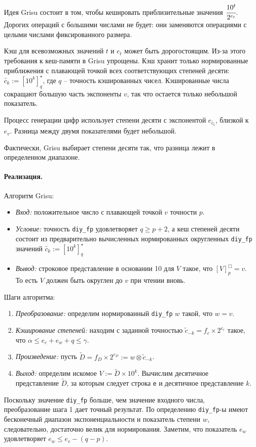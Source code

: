 \documentclass[a4paper, 12pt, twoside]{article}
\begin{document}
Идея \textsf{Grisu} состоит в том, чтобы кешировать приблизительные значения $\cfrac{10^t}{2^{e_t}}$.
Дорогих операций с большими числами не будет: они заменяются операциями с целыми числами фиксированного размера.

Кэш для всевозможных значений $t$ и $e_t$ может быть дорогостоящим. 
Из-за этого требования к кеш-памяти в \textsf{Grisu} упрощены. 
Кэш хранит только нормированные приближения с плавающей точкой всех соответствующих степеней десяти: $\tilde{c_k} := \left[ 10^k \right]_q^{\star}$, где $q$ -- точность кэшированных чисел.
Кэшированные числа сокращают большую часть экспоненты $v$, так что остается только небольшой показатель. 

Процесс генерации цифр использует степени десяти с экспонентой $e_{\tilde{c_t}}$, близкой к $e_v$. 
Разница между двумя показателями будет небольшой.

Фактически, \textsf{Grisu} выбирает степени десяти так, что разница лежит в определенном диапазоне. 

\paragraph{Реализация.}
Алгоритм \textsf{Grisu}: \begin{itemize}
\item \textit{Вход:} положительное число с плавающей точкой $v$ точности $p$.
\item \textit{Условие:} точность \texttt{diy\_fp} удовлетворяет $q \geqslant p + 2$, а кеш степеней десяти состоит из предварительно вычисленных нормированных округленных  \texttt{diy\_fp} значений $\tilde{c_k} := \left[ 10^k \right]_q^{\star}$
\item \textit{Вывод:} строковое представление в основании 10 для $V$ такое, что $[V]^{\Box}_p = v$. 
То есть $V$ должен быть округлен до $v$ при чтении вновь.
\end{itemize}

Шаги алгоритма:
\begin{enumerate}
\item \textit{Преобразование:} определим нормированный \texttt{diy\_fp} $w$ такой, что $w = v$.
\item \textit{Кэширование степеней:} находим с заданной точностью $\tilde{c}_{-k} = f_c \times 2^{e_c}$ такое, что $\alpha \leqslant e_c + e_w + q \leqslant \gamma$.
\item \textit{Произведение:} пусть $\tilde{D} = f_D \times 2^{e_D} := w \otimes \tilde{c}_{-k}$.
\item \textit{Выход:} определим искомое $V := \tilde{D} \times 10^k$. 
Вычислим десятичное представление $\tilde{D}$, за которым следует строка \texttt{e} и десятичное представление $k$.
\end{enumerate}
Поскольку значение \texttt{diy\_fp} больше, чем значение входного числа, преобразование шага 1 дает точный результат. 
По определению \texttt{diy\_fp}-ы имеют бесконечный диапазон экспоненциальности и показатель степени $w$, следовательно, достаточно велик для нормирования. 
Заметим, что показатель $e_w$ удовлетворяет $e_w \leqslant e_v - (q - p)$. 
\end{document}
